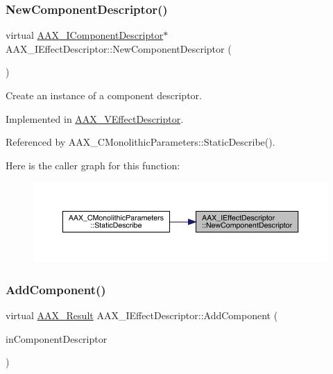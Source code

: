 \subsubsection{\texorpdfstring{NewComponentDescriptor()}{NewComponentDescriptor()}}
{\footnotesize\ttfamily virtual \mbox{\hyperlink{a01781}{A\+A\+X\+\_\+\+I\+Component\+Descriptor}}$\ast$ A\+A\+X\+\_\+\+I\+Effect\+Descriptor\+::\+New\+Component\+Descriptor (\begin{DoxyParamCaption}{ }\end{DoxyParamCaption})\hspace{0.3cm}{\ttfamily [pure virtual]}}



Create an instance of a component descriptor. 



Implemented in \mbox{\hyperlink{a01913_a5bfabf31ae3378c465438313c7b22c19}{A\+A\+X\+\_\+\+V\+Effect\+Descriptor}}.



Referenced by A\+A\+X\+\_\+\+C\+Monolithic\+Parameters\+::\+Static\+Describe().

Here is the caller graph for this function\+:
\nopagebreak
\begin{figure}[H]
\begin{center}
\leavevmode
\includegraphics[width=350pt]{a01813_a2102ea4391f5b60e4d5e860a997383e4_icgraph}
\end{center}
\end{figure}
\mbox{\label{a01813_aec33938f50461dd5e7c1dcc25faf6917}} 
\subsubsection{\texorpdfstring{AddComponent()}{AddComponent()}}
{\footnotesize\ttfamily virtual \mbox{\hyperlink{a00392_a4d8f69a697df7f70c3a8e9b8ee130d2f}{A\+A\+X\+\_\+\+Result}} A\+A\+X\+\_\+\+I\+Effect\+Descriptor\+::\+Add\+Component (\begin{DoxyParamCaption}\item[{\mbox{\hyperlink{a01781}{A\+A\+X\+\_\+\+I\+Component\+Descriptor}} $\ast$}]{in\+Component\+Descriptor }\end{DoxyParamCaption})\hspace{0.3cm}{\ttfamily [pure virtual]}}



